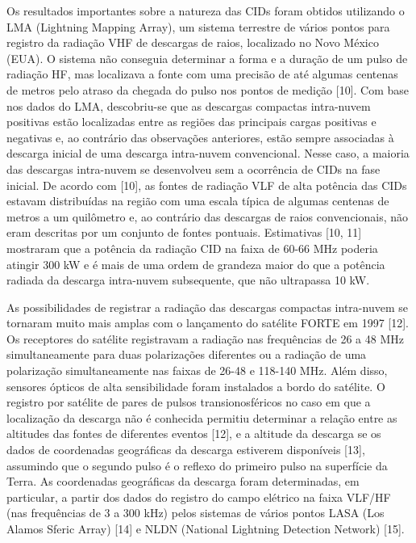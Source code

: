\documentclass[a4paper, 12pt, onecolumn,singlespacing]{article}
\begin{document}
	Os resultados importantes sobre a natureza das CIDs foram obtidos utilizando o LMA (Lightning Mapping Array), um sistema terrestre de vários pontos para registro da radiação VHF de descargas de raios, localizado no Novo México (EUA). O sistema não conseguia determinar a forma e a duração de um pulso de radiação HF, mas localizava a fonte com uma precisão de até algumas centenas de metros pelo atraso da chegada do pulso nos pontos de medição [10]. Com base nos dados do LMA, descobriu-se que as descargas compactas intra-nuvem positivas estão localizadas entre as regiões das principais cargas positivas e negativas e, ao contrário das observações anteriores, estão sempre associadas à descarga inicial de uma descarga intra-nuvem convencional. Nesse caso, a maioria das descargas intra-nuvem se desenvolveu sem a ocorrência de CIDs na fase inicial. De acordo com [10], as fontes de radiação VLF de alta potência das CIDs estavam distribuídas na região com uma escala típica de algumas centenas de metros a um quilômetro e, ao contrário das descargas de raios convencionais, não eram descritas por um conjunto de fontes pontuais. Estimativas [10, 11] mostraram que a potência da radiação CID na faixa de 60-66 MHz poderia atingir 300 kW e é mais de uma ordem de grandeza maior do que a potência radiada da descarga intra-nuvem subsequente, que não ultrapassa 10 kW.
	
	As possibilidades de registrar a radiação das descargas compactas intra-nuvem se tornaram muito mais amplas com o lançamento do satélite FORTE em 1997 [12]. Os receptores do satélite registravam a radiação nas frequências de 26 a 48 MHz simultaneamente para duas polarizações diferentes ou a radiação de uma polarização simultaneamente nas faixas de 26-48 e 118-140 MHz. Além disso, sensores ópticos de alta sensibilidade foram instalados a bordo do satélite. O registro por satélite de pares de pulsos transionosféricos no caso em que a localização da descarga não é conhecida permitiu determinar a relação entre as altitudes das fontes de diferentes eventos [12], e a altitude da descarga se os dados de coordenadas geográficas da descarga estiverem disponíveis [13], assumindo que o segundo pulso é o reflexo do primeiro pulso na superfície da Terra. As coordenadas geográficas da descarga foram determinadas, em particular, a partir dos dados do registro do campo elétrico na faixa VLF/HF (nas frequências de 3 a 300 kHz) pelos sistemas de vários pontos LASA (Los Alamos Sferic Array) [14] e NLDN (National Lightning Detection Network) [15].
	
\end{document}
